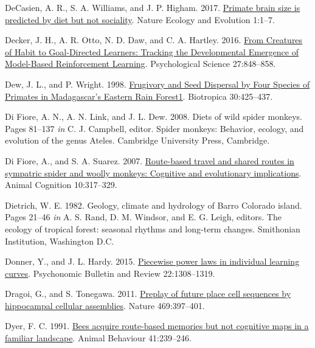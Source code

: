\documentclass[twoside,12pt,final]{ucthesis-CA2012}
\newenvironment{CSLReferences}%
  {}%
  {\par}
\begin{document}
\begin{ucmainmatter}
\begin{CSLReferences}{1}{0}
\leavevmode{}%
DeCasien, A. R., S. A. Williams, and J. P. Higham. 2017. \href{https://doi.org/10.1038/s41559-017-0112}{Primate brain size is predicted by diet but not sociality}. Nature Ecology and Evolution 1:1--7.

\leavevmode{}%
Decker, J. H., A. R. Otto, N. D. Daw, and C. A. Hartley. 2016. \href{https://doi.org/10.1177/0956797616639301}{From Creatures of Habit to Goal-Directed Learners: Tracking the Developmental Emergence of Model-Based Reinforcement Learning}. Psychological Science 27:848--858.

\leavevmode{}%
Dew, J. L., and P. Wright. 1998. \href{https://doi.org/10.1111/j.1744-7429.1998.tb00076.x}{Frugivory and Seed Dispersal by Four Species of Primates in Madagascar's Eastern Rain Forest1}. Biotropica 30:425--437.

\leavevmode{}%
Di Fiore, A. N., A. N. Link, and J. L. Dew. 2008. Diets of wild spider monkeys. Pages 81--137 \emph{in} C. J. Campbell, editor. Spider monkeys: Behavior, ecology, and evolution of the genus Ateles. Cambridge University Press, Cambridge.

\leavevmode{}%
Di Fiore, A., and S. A. Suarez. 2007. \href{https://doi.org/10.1007/s10071-006-0067-y}{Route-based travel and shared routes in sympatric spider and woolly monkeys: Cognitive and evolutionary implications}. Animal Cognition 10:317--329.

\leavevmode{}%
Dietrich, W. E. 1982. Geology, climate and hydrology of Barro Colorado island. Pages 21--46 \emph{in} A. S. Rand, D. M. Windsor, and E. G. Leigh, editors. The ecology of tropical forest: seasonal rhythms and long-term changes. Smithonian Institution, Washington D.C.

\leavevmode{}%
Donner, Y., and J. L. Hardy. 2015. \href{https://doi.org/10.3758/s13423-015-0811-x}{Piecewise power laws in individual learning curves}. Psychonomic Bulletin and Review 22:1308--1319.

\leavevmode{}%
Dragoi, G., and S. Tonegawa. 2011. \href{https://doi.org/10.1038/nature09633}{Preplay of future place cell sequences by hippocampal cellular assemblies}. Nature 469:397--401.

\leavevmode{}%
Dyer, F. C. 1991. \href{https://doi.org/10.1016/S0003-3472(05)80475-0}{Bees acquire route-based memories but not cognitive maps in a familiar landscape}. Animal Behaviour 41:239--246.


\end{CSLReferences}
\end{ucmainmatter}
\end{document}

